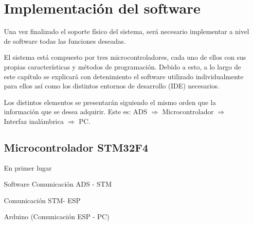 \chapter{Implementación del software\label{sec:Implementacion_soft}}

Una vez finalizado el soporte físico del sistema, será necesario implementar a nivel de software todas las funciones deseadas.

El sistema está compuesto por tres microcontroladores, cada uno de ellos con sus propias características y métodos de programación. Debido a esto, a lo largo de este capítulo se explicará con detenimiento el software utilizado individualmente para ellos así como los distintos entornos de desarrollo (\acrshort{IDE}) necesarios.

Los distintos elementos se presentarán siguiendo el mismo orden que la información que se desea adquirir. Este es:
ADS $\Rightarrow$ Microcontrolador $\Rightarrow$ Interfaz inalámbrica $\Rightarrow$ PC.

\section{Microcontrolador STM32F4\label{Software_micro}}

En primer lugar 

Software
	Comunicación ADS - STM
	
	Comunicación STM- ESP
	
	Arduino (Comunicación ESP - PC)
	
	